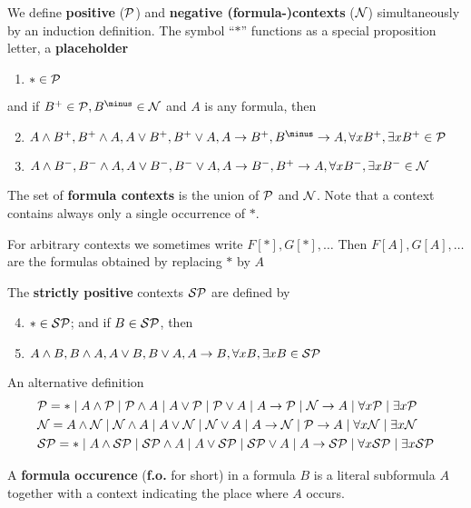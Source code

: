 \documentclass[11pt]{article}
\begin{document}
\begin{definition}[]
We define \textbf{positive} (\(\mathcal{P}\)) and \textbf{negative (formula-)contexts} (\(\mathcal{N}\))
simultaneously by an induction definition. The symbol ``\(*\)'' functions as a
special proposition letter, a \textbf{placeholder}
\begin{enumerate}
\item \(*\in\mathcal{P}\)
\end{enumerate}


and if \(B^+\in \calp,B^{\minus}\in\caln\) and \(A\) is any formula, then
\begin{enumerate}
\setcounter{enumi}{1}
\item \(A\wedge B^+,B^+\wedge A,A\vee B^+,B^+\vee A,A\to B^+,B^{\minus}\to A,
       \forall xB^+,\exists xB^+\in\calp\)

\item \(A\wedge B^-,B^-\wedge A,A\vee B^-,B^-\vee A,A\to B^-,B^+\to A,
       \forall xB^-,\exists xB^-\in\mathcal{N}\)
\end{enumerate}


The set of \textbf{formula contexts} is the union of \(\mathcal{P}\) and \(\mathcal{N}\). Note that a
context contains always only a single occurrence of \(*\).

For arbitrary contexts we sometimes write \(F[*],G[*],\dots\) Then
\(F[A],G[A],\dots\) are the formulas obtained by replacing \(*\) by \(A\)

The \textbf{strictly positive} contexts \(\mathcal{S}\mathcal{P}\) are defined by
\begin{enumerate}
\setcounter{enumi}{3}
\item \(*\in\mathcal{S}\mathcal{P}\); and if \(B\in\mathcal{S}\mathcal{P}\), then
\item \(A\wedge B,B\wedge A,A\vee B,B\vee A,A\to B,\forall xB,\exists
       xB\in\mathcal{S}\mathcal{P}\)
\end{enumerate}


An alternative definition
\begin{align*}
&\mathcal{P}=*\mid A\wedge\mathcal{P}\mid\mathcal{P}\wedge A\mid A\vee\mathcal{P}\mid\mathcal{P}\vee A\mid 
A\to\mathcal{P}\mid\mathcal{N}\to A\mid\forall x\mathcal{P}\mid\exists x\mathcal{P}\\
&\mathcal{N}=A\wedge\mathcal{N}\mid\mathcal{N}\wedge A\mid A\vee\mathcal{N}\mid\mathcal{N}\vee A\mid A\to\mathcal{N}
\mid\mathcal{P}\to A\mid\forall x\mathcal{N}\mid \exists x\mathcal{N}\\
&\mathcal{S}\mathcal{P}=*\mid A\wedge\mathcal{S}\mathcal{P}\mid\mathcal{S}\mathcal{P}\wedge A\mid
A\vee\mathcal{S}\mathcal{P}\mid\mathcal{S}\mathcal{P}\vee A\mid A\to\mathcal{S}\mathcal{P}
\mid\forall x\mathcal{S}\mathcal{P}\mid\exists x\mathcal{S}\mathcal{P}
\end{align*}

A \textbf{formula occurence} (\textbf{f.o.} for short) in a formula \(B\) is a literal
subformula \(A\) together with a context indicating the place where \(A\) occurs.
\end{definition}
\end{document}
